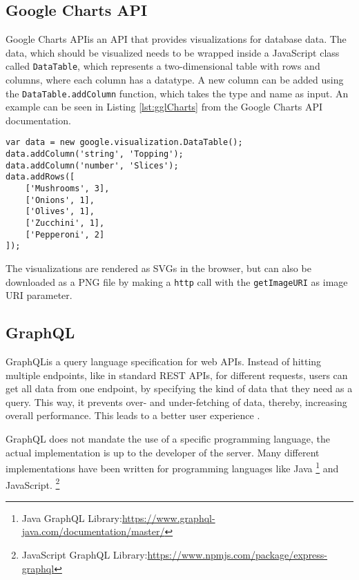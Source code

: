 \subsection{Google Charts API}
Google Charts API\footnotemark is an API that provides visualizations for database data. The data, which should be visualized needs to be wrapped inside a JavaScript class called \texttt{DataTable}, which represents a two-dimensional table with rows and columns, where each column has a datatype.
A new column can be added using the \texttt{DataTable.addColumn} function, which takes the type and name as input. An example can be seen in Listing \ref{lst:gglCharts} from the Google Charts API documentation\footnotemark[\value{footnote}].

\begin{lstlisting}[caption=Example use of the DataTable class,captionpos=b,label={lst:gglCharts}]
var data = new google.visualization.DataTable();
data.addColumn('string', 'Topping');
data.addColumn('number', 'Slices');
data.addRows([
	['Mushrooms', 3],
	['Onions', 1],
	['Olives', 1], 
	['Zucchini', 1],
	['Pepperoni', 2]
]);
\end{lstlisting}

The visualizations are rendered as SVGs in the browser, but can also be downloaded as a PNG file by making a \texttt{http} call with the \texttt{getImageURI} as image URI parameter. 


\subsection{GraphQL}
GraphQL\footnotemark is a query language specification for web APIs.
Instead of hitting multiple endpoints, like in standard REST APIs, for different requests, users can get all data from one endpoint, by specifying the kind of data that they need as a query. This way, it prevents over- and under-fetching of data\footnotemark, thereby, increasing overall performance. This leads to a better user experience \cite{KKK20}.


GraphQL does not mandate the use of a specific programming language, the actual implementation is up to the developer of the server. \footnotemark
{}
Many different implementations have been written for programming languages like Java \footnote{Java GraphQL Library:\href{https://www.graphql-java.com/documentation/master/}{https://www.graphql-java.com/documentation/master/}} and JavaScript. \footnote{JavaScript GraphQL Library:\href{https://www.npmjs.com/package/express-graphql}{https://www.npmjs.com/package/express-graphql}}

